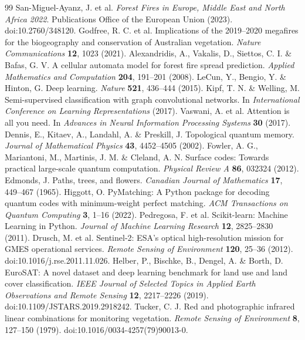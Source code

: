 \documentclass[fleqn,10pt]{wlscirep}
\begin{document}
\begin{thebibliography}{99}
 San-Miguel-Ayanz, J. et al. \textit{Forest Fires in Europe, Middle East and North Africa 2022}. Publications Office of the European Union (2023). doi:10.2760/348120.
 Godfree, R. C. et al. Implications of the 2019--2020 megafires for the biogeography and conservation of Australian vegetation. \textit{Nature Communications} \textbf{12}, 1023 (2021).
 Alexandridis, A., Vakalis, D., Siettos, C. I. \& Bafas, G. V. A cellular automata model for forest fire spread prediction. \textit{Applied Mathematics and Computation} \textbf{204}, 191--201 (2008).
 LeCun, Y., Bengio, Y. \& Hinton, G. Deep learning. \textit{Nature} \textbf{521}, 436--444 (2015).
 Kipf, T. N. \& Welling, M. Semi-supervised classification with graph convolutional networks. In \textit{International Conference on Learning Representations} (2017).
 Vaswani, A. et al. Attention is all you need. In \textit{Advances in Neural Information Processing Systems} \textbf{30} (2017).
 Dennis, E., Kitaev, A., Landahl, A. \& Preskill, J. Topological quantum memory. \textit{Journal of Mathematical Physics} \textbf{43}, 4452--4505 (2002).
 Fowler, A. G., Mariantoni, M., Martinis, J. M. \& Cleland, A. N. Surface codes: Towards practical large-scale quantum computation. \textit{Physical Review A} \textbf{86}, 032324 (2012).
 Edmonds, J. Paths, trees, and flowers. \textit{Canadian Journal of Mathematics} \textbf{17}, 449--467 (1965).
 Higgott, O. PyMatching: A Python package for decoding quantum codes with minimum-weight perfect matching. \textit{ACM Transactions on Quantum Computing} \textbf{3}, 1--16 (2022).
 Pedregosa, F. et al. Scikit-learn: Machine Learning in Python. \textit{Journal of Machine Learning Research} \textbf{12}, 2825--2830 (2011).
 Drusch, M. et al. Sentinel-2: ESA's optical high-resolution mission for GMES operational services. \textit{Remote Sensing of Environment} \textbf{120}, 25--36 (2012). doi:10.1016/j.rse.2011.11.026.
 Helber, P., Bischke, B., Dengel, A. \& Borth, D. EuroSAT: A novel dataset and deep learning benchmark for land use and land cover classification. \textit{IEEE Journal of Selected Topics in Applied Earth Observations and Remote Sensing} \textbf{12}, 2217--2226 (2019). doi:10.1109/JSTARS.2019.2918242.
 Tucker, C. J. Red and photographic infrared linear combinations for monitoring vegetation. \textit{Remote Sensing of Environment} \textbf{8}, 127--150 (1979). doi:10.1016/0034-4257(79)90013-0.

\end{thebibliography}
\end{document}
